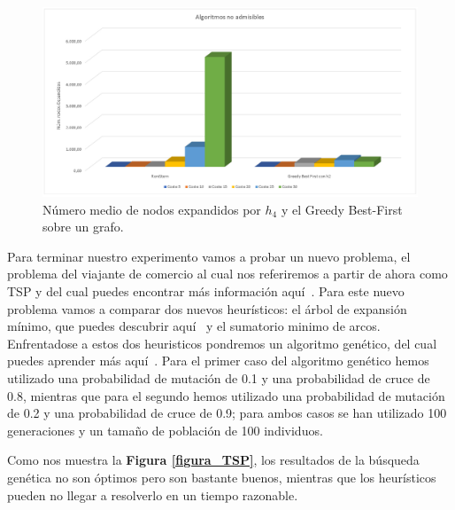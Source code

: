 \documentclass[runningheads]{llncs}
\begin{document}
\begin{figure}
	\centering
	\includegraphics[width=\textwidth]{ejercicio6.jpg}
	\caption{Número medio de nodos expandidos por $ h_4 $ y el Greedy Best-First sobre un grafo.} 
	\label{figura_Greedy}
\end{figure}

Para terminar nuestro experimento vamos a probar un nuevo problema, el problema del viajante de comercio al cual nos referiremos a partir de ahora como TSP y del cual puedes encontrar más información aquí~\cite{referencia_TSP}. Para este nuevo problema vamos a comparar dos nuevos heurísticos: el árbol de expansión mínimo, que puedes descubrir aquí~\cite{referencia_Arbol_Expansion} y el sumatorio minimo de arcos. Enfrentadose a estos dos heuristicos pondremos un algoritmo genético, del cual puedes aprender más aquí~\cite{referencia_Algoritmo_Genetico}. Para el primer caso del algoritmo genético hemos utilizado una probabilidad de mutación de 0.1 y una probabilidad de cruce de 0.8, mientras que para el segundo hemos utilizado una probabilidad de mutación de 0.2 y una probabilidad de cruce de 0.9; para ambos casos se han utilizado 100 generaciones y un tamaño de población de 100 individuos.

Como nos muestra la \textbf{Figura \ref{figura_TSP}}, los resultados de la búsqueda genética no son óptimos pero son bastante buenos, mientras que los heurísticos pueden no llegar a resolverlo en un tiempo razonable.
\end{document}
